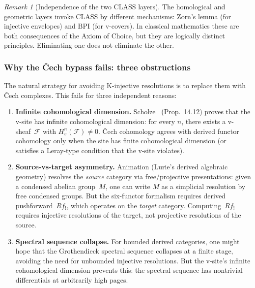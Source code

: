 \documentclass[12pt, a4paper]{article}
\theoremstyle{plain}
\theoremstyle{definition}
\theoremstyle{remark}
\newtheorem{remark}[theorem]{Remark}
\newcommand{\CLASS}{\mathrm{CLASS}}
\newcommand{\BPI}{\mathrm{BPI}}
\begin{document}
\begin{remark}[Independence of the two $\CLASS$ layers]\label{rem:independence}
The homological and geometric layers invoke $\CLASS$ by different
mechanisms: Zorn's lemma (for injective envelopes) and $\BPI$
(for v-covers).  In classical mathematics these are both consequences
of the Axiom of Choice, but they are logically distinct principles.
Eliminating one does not eliminate the other.
\end{remark}

\subsubsection{Why the \v{C}ech bypass fails: three obstructions}

The natural strategy for avoiding K-injective resolutions is to
replace them with \v{C}ech complexes.  This fails for three
independent reasons:

\begin{enumerate}[label=(\arabic*)]
  \item \textbf{Infinite cohomological dimension.}
    Scholze~\cite{scholze-diamonds} (Prop.~14.12) proves that the
    v-site has infinite cohomological dimension: for every $n$,
    there exists a v-sheaf~$\mathcal{F}$ with
    $H^n_v(\mathcal{F}) \neq 0$.  \v{C}ech cohomology agrees with
    derived functor cohomology only when the site has finite
    cohomological dimension (or satisfies a Leray-type condition
    that the v-site violates).

  \item \textbf{Source-vs-target asymmetry.}
    Animation (Lurie's derived algebraic geometry) resolves the
    \emph{source} category via free/projective presentations: given
    a condensed abelian group~$M$, one can write $M$ as a
    simplicial resolution by free condensed groups.  But the
    six-functor formalism requires derived pushforward~$Rf_!$,
    which operates on the \emph{target} category.  Computing~$Rf_!$
    requires injective resolutions of the target, not projective
    resolutions of the source.

  \item \textbf{Spectral sequence collapse.}
    For bounded derived categories, one might hope that the Grothendieck
    spectral sequence collapses at a finite stage, avoiding the need
    for unbounded injective resolutions.  But the v-site's infinite
    cohomological dimension prevents this: the spectral sequence
    has nontrivial differentials at arbitrarily high pages.
\end{enumerate}
\end{document}
